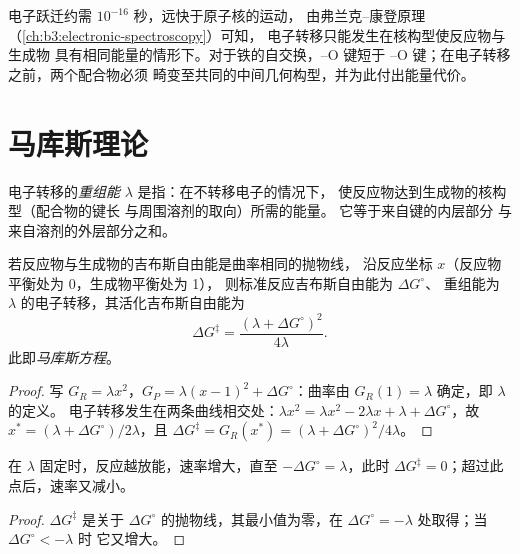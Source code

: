 电子跃迁约需 $10^{-16}$ 秒，远快于原子核的运动，
由弗兰克–康登原理（\cref{ch:b3:electronic-spectroscopy}）可知，
电子转移只能发生在核构型使反应物与生成物
具有相同能量的情形下。对于铁的自交换，--O 键短于
--O 键；在电子转移之前，两个配合物必须
畸变至共同的中间几何构型，并为此付出能量代价。

\section{马库斯理论}

\begin{definition}[重组能]\label{def:b3:complex-mechanisms:reorganisation}
电子转移的\emph{重组能} $\lambda$ 是指：在不转移电子的情况下，
使反应物达到生成物的核构型（配合物的键长
与周围溶剂的取向）所需的能量。
它等于来自键的内层部分
与来自溶剂的外层部分之和。
\end{definition}

\begin{theorem}[马库斯方程]\label{thm:b3:complex-mechanisms:marcus}
若反应物与生成物的吉布斯自由能是曲率相同的抛物线，
沿反应坐标 $x$（反应物平衡处为 0，生成物平衡处为 1），
则标准反应吉布斯自由能为 $\Delta G^\circ$、
重组能为 $\lambda$ 的电子转移，其活化吉布斯自由能为
\[
  \Delta G^{\ddagger} = \frac{(\lambda + \Delta G^\circ)^2}{4\lambda} .
\]
此即\emph{马库斯方程}。
\end{theorem}

\begin{proof}
写 $G_R = \lambda x^2$，$G_P = \lambda(x - 1)^2 + \Delta G^\circ$：曲率由 $G_R(1) = \lambda$ 确定，即 $\lambda$ 的定义。
电子转移发生在两条曲线相交处：$\lambda x^2 = \lambda x^2 - 2\lambda x + \lambda +
\Delta G^\circ$，故 $x^\ast = (\lambda + \Delta G^\circ)/2\lambda$，且 $\Delta G^{\ddagger} = G_R(x^\ast) = (\lambda + \Delta G^\circ)^2/4\lambda$。
\end{proof}

\begin{corollary}[反转区]\label{cor:b3:complex-mechanisms:inverted}
在 $\lambda$ 固定时，反应越放能，速率增大，直至
$-\Delta G^\circ = \lambda$，此时 $\Delta G^{\ddagger} = 0$；超过此点后，速率又减小。
\end{corollary}

\begin{proof}
$\Delta G^{\ddagger}$ 是关于 $\Delta G^\circ$ 的抛物线，其最小值为零，在 $\Delta G^\circ = -\lambda$ 处取得；当 $\Delta G^\circ < -\lambda$ 时
它又增大。
\end{proof}

